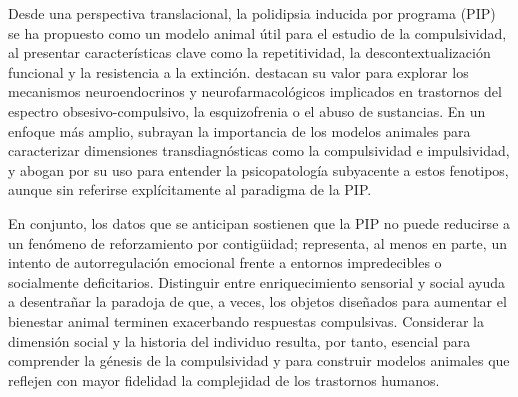 \documentclass[12pt,a4paper]{article}
\begin{document}
\begin{multicols}{2}
Desde una perspectiva translacional, la polidipsia inducida por programa (PIP) se ha propuesto como un modelo animal útil para el estudio de la compulsividad, al presentar características clave como la repetitividad, la descontextualización funcional y la resistencia a la extinción. \citet{Moreno2012} destacan su valor para explorar los mecanismos neuroendocrinos y neurofarmacológicos implicados en trastornos del espectro obsesivo-compulsivo, la esquizofrenia o el abuso de sustancias. En un enfoque más amplio, \citet{Fineberg2010} subrayan la importancia de los modelos animales para caracterizar dimensiones transdiagnósticas como la compulsividad e impulsividad, y abogan por su uso para entender la psicopatología subyacente a estos fenotipos, aunque sin referirse explícitamente al paradigma de la PIP.

En conjunto, los datos que se anticipan sostienen que la PIP no puede reducirse a un fenómeno de reforzamiento por contigüidad; representa, al menos en parte, un intento de autorregulación emocional frente a entornos impredecibles o socialmente deficitarios. Distinguir entre enriquecimiento sensorial y social ayuda a desentrañar la paradoja de que, a veces, los objetos diseñados para aumentar el bienestar animal terminen exacerbando respuestas compulsivas. Considerar la dimensión social y la historia del individuo resulta, por tanto, esencial para comprender la génesis de la compulsividad y para construir modelos animales que reflejen con mayor fidelidad la complejidad de los trastornos humanos.




\end{multicols}
\end{document}
